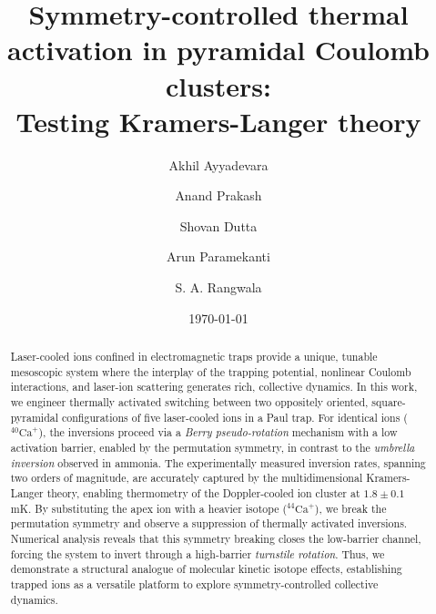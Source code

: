 \documentclass[aps,prl,twocolumn,superscriptaddress,showpacs,floatfix]{revtex4-2}
\begin{document}

\title{
Symmetry-controlled thermal activation in pyramidal Coulomb clusters:\\ Testing Kramers-Langer theory
}

\author{Akhil Ayyadevara}

\author{Anand Prakash}
\author{Shovan Dutta}
\author{Arun Paramekanti}
\author{S. A. Rangwala}


\date{\today}

\begin{abstract}

Laser-cooled ions confined in electromagnetic traps provide a unique, tunable mesoscopic system where the interplay of the trapping potential, nonlinear Coulomb interactions, and laser-ion scattering generates rich, collective dynamics. In this work, we engineer thermally activated switching between two oppositely oriented, square-pyramidal configurations of five laser-cooled ions in a Paul trap. For identical ions ($^{40}\mathrm{Ca}^{+}$), the inversions proceed via a \textit{Berry pseudo-rotation} mechanism with a low activation barrier, enabled by the permutation symmetry, in contrast to the \textit{umbrella inversion} observed in ammonia. The experimentally measured inversion rates, spanning two orders of magnitude, are accurately captured by the multidimensional Kramers-Langer theory, enabling thermometry of the Doppler-cooled ion cluster at $1.8\pm0.1$ mK. By substituting the apex ion with a heavier isotope ($^{44}\mathrm{Ca}^{+}$), we break the permutation symmetry and observe a suppression of thermally activated inversions. Numerical analysis reveals that this symmetry breaking closes the low-barrier channel, forcing the system to invert through a high-barrier \textit{turnstile rotation}. Thus, we demonstrate a structural analogue of molecular kinetic isotope effects, establishing trapped ions as a versatile platform to explore symmetry-controlled collective dynamics.

\end{abstract}
\end{document}
